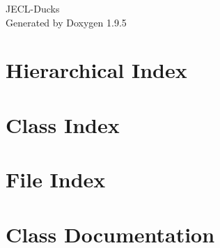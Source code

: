 \documentclass[twoside]{book}
\newcommand{\+}{\discretionary{\mbox{\scriptsize$\hookleftarrow$}}{}{}}
\newcommand{\clearemptydoublepage}{%
    \newpage{\pagestyle{empty}\cleardoublepage}%
  }
\begin{document}
  \raggedbottom
    \hypersetup{pageanchor=false,
                bookmarksnumbered=true,
                pdfencoding=unicode
               }
  \begin{titlepage}
  \vspace*{7cm}
  \begin{center}%
  {\Large JECL-\/\+Ducks}\\
  \vspace*{1cm}
  {\large Generated by Doxygen 1.9.5}\\
  \end{center}
  \end{titlepage}
  \clearemptydoublepage
  \tableofcontents
  \clearemptydoublepage
  \hypersetup{pageanchor=true}
\chapter{Hierarchical Index}

\chapter{Class Index}

\chapter{File Index}

\chapter{Class Documentation}








































\end{document}

